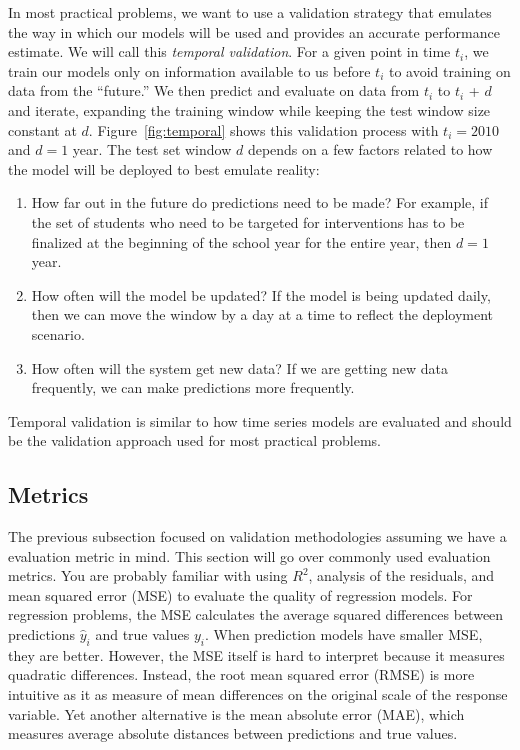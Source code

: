 \documentclass[]{krantz}
\begin{document}
In most practical problems, we want to use a validation strategy that
emulates the way in which our models will be used and provides an
accurate performance estimate. We will call this \emph{temporal
validation}. For a given point in time \(t_i\), we train our models only
on information available to us before \(t_i\) to avoid training on data
from the ``future.'' We then predict and evaluate on data from \(t_i\)
to \(t_i\) + \(d\) and iterate, expanding the training window while
keeping the test window size constant at \(d\).
Figure~\ref{fig:temporal} shows this validation process with
\(t_i=2010\) and \(d=1\) year. The test set window \(d\) depends on a
few factors related to how the model will be deployed to best emulate
reality:

\begin{enumerate}
\def\labelenumi{\arabic{enumi}.}
\item
  How far out in the future do predictions need to be made? For example,
  if the set of students who need to be targeted for interventions has
  to be finalized at the beginning of the school year for the entire
  year, then \(d = 1\) year.
\item
  How often will the model be updated? If the model is being updated
  daily, then we can move the window by a day at a time to reflect the
  deployment scenario.
\item
  How often will the system get new data? If we are getting new data
  frequently, we can make predictions more frequently.
\end{enumerate}

Temporal validation is similar to how time series models are evaluated
and should be the validation approach used for most practical problems.

\subsection{Metrics}\label{metrics}

The previous subsection focused on validation methodologies assuming we
have a evaluation metric in mind. This section will go over commonly
used evaluation metrics. You are probably familiar with using \(R^2\),
analysis of the residuals, and mean squared error (MSE) to evaluate the
quality of regression models. For regression problems, the MSE
calculates the average squared differences between predictions
\(\hat{y}_i\) and true values \(y_i\). When prediction models have
smaller MSE, they are better. However, the MSE itself is hard to
interpret because it measures quadratic differences. Instead, the root
mean squared error (RMSE) is more intuitive as it as measure of mean
differences on the original scale of the response variable. Yet another
alternative is the mean absolute error (MAE), which measures average
absolute distances between predictions and true values.
\end{document}
